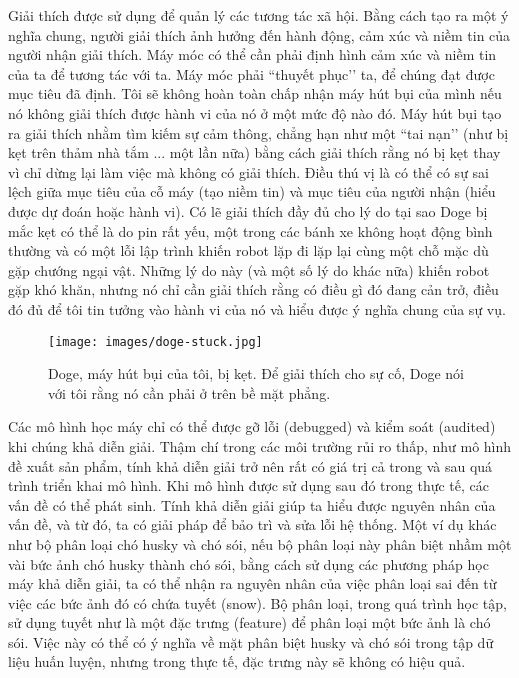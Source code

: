 Giải thích được sử dụng để quản lý các tương tác xã hội. Bằng cách tạo ra một ý nghĩa chung, người giải thích ảnh hưởng đến hành động, cảm xúc và niềm tin của người nhận giải thích. Máy móc có thể cần phải định hình cảm xúc và niềm tin của ta để tương tác với ta. Máy móc phải ``thuyết phục’’ ta, để chúng đạt được mục tiêu đã định. Tôi sẽ không hoàn toàn chấp nhận máy hút bụi của mình nếu nó không giải thích được hành vi của nó ở một mức độ nào đó. Máy hút bụi tạo ra giải thích nhằm tìm kiếm sự cảm thông, chẳng hạn như một ``tai nạn’’ (như bị kẹt trên thảm nhà tắm ... một lần nữa) bằng cách giải thích rằng nó bị kẹt thay vì chỉ dừng lại làm việc mà không có giải thích. Điều thú vị là có thể có sự sai lệch giữa mục tiêu của cỗ máy (tạo niềm tin) và mục tiêu của người nhận (hiểu được dự đoán hoặc hành vi). Có lẽ giải thích đầy đủ cho lý do tại sao Doge bị mắc kẹt có thể là do pin rất yếu, một trong các bánh xe không hoạt động bình thường và có một lỗi lập trình khiến robot lặp đi lặp lại cùng một chỗ mặc dù gặp chướng ngại vật. Những lý do này (và một số lý do khác nữa) khiến robot gặp khó khăn, nhưng nó chỉ cần giải thích rằng có điều gì đó đang cản trở, điều đó đủ để tôi tin tưởng vào hành vi của nó và hiểu được ý nghĩa chung của sự vụ.

\begin{figure*}[h!]
	\centering
	\texttt{[image: images/doge-stuck.jpg]}
	\caption{Doge, máy hút bụi của tôi, bị kẹt. Để giải thích cho sự cố, Doge nói với tôi rằng nó cần phải ở trên bề mặt phẳng.}
\end{figure*}

Các mô hình học máy chỉ có thể được gỡ lỗi (debugged) và kiểm soát (audited) khi chúng khả diễn giải. Thậm chí trong các môi trường rủi ro thấp, như mô hình đề xuất sản phẩm, tính khả diễn giải trở nên rất có giá trị cả trong và sau quá trình triển khai mô hình. Khi mô hình được sử dụng sau đó trong thực tế, các vấn đề có thể phát sinh. Tính khả diễn giải giúp ta hiểu được nguyên nhân của vấn đề, và từ đó, ta có giải pháp để bảo trì và sửa lỗi hệ thống. Một ví dụ khác như bộ phân loại chó husky và chó sói, nếu bộ phân loại này phân biệt nhầm một vài bức ảnh chó husky thành chó sói, bằng cách sử dụng các phương pháp học máy khả diễn giải, ta có thể nhận ra nguyên nhân của việc phân loại sai đến từ việc các bức ảnh đó có chứa tuyết (snow). Bộ phân loại, trong quá trình học tập, sử dụng tuyết như là một đặc trưng (feature) để phân loại một bức ảnh là chó sói. Việc này có thể có ý nghĩa về mặt phân biệt husky và chó sói trong tập dữ liệu huấn luyện, nhưng trong thực tế, đặc trưng này sẽ không có hiệu quả.

